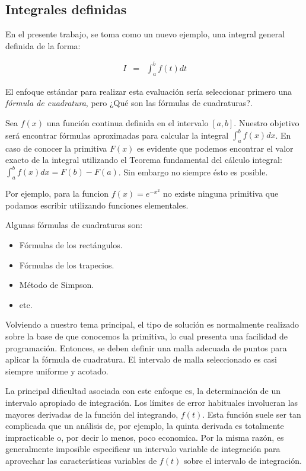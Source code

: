 \subsection{Integrales definidas}
En el presente trabajo, se toma como un nuevo ejemplo, una integral general definida de la forma:

\begin{eqnarray}
	I &=& \int_{a}^{b} f(t) dt
\end{eqnarray}

El enfoque estándar para realizar esta evaluación sería seleccionar primero una \emph{fórmula de cuadratura},
pero ¿Qué son las fórmulas de cuadraturas?.

Sea $f(x)$ una función continua definida en el intervalo $[a, b]$.
Nuestro objetivo será encontrar fórmulas aproximadas para calcular la integral $\int_{a}^{b}f(x) dx$.
En caso de conocer la primitiva $F(x)$ es evidente que podemos encontrar el valor exacto de la integral
utilizando el Teorema fundamental del cálculo integral: $\int_{a}^{b}f(x) dx = F(b) - F(a)$.
Sin embargo no siempre ésto es posible.

Por ejemplo, para la funcion $f(x) = e^{-x^{2}}$
no existe ninguna primitiva que podamos escribir utilizando funciones elementales.

Algunas fórmulas de cuadraturas son:
\begin{itemize}
	\item Fórmulas de los rectángulos.
	\item Fórmulas de  los trapecios.
	\item Método de Simpson.
	\item etc.
\end{itemize}

Volviendo a nuestro tema principal, el tipo de solución es normalmente realizado sobre la base de que conocemos
la primitiva, lo cual presenta una  facilidad de programación.
Entonces, se deben definir una malla adecuada de puntos para aplicar la fórmula de cuadratura.
El intervalo de malla seleccionado es casi siempre uniforme y acotado.

La principal dificultad asociada con este enfoque es, la determinación de un intervalo apropiado de integración.
Los límites de error habituales involucran las mayores derivadas de la función del integrando, $f(t)$.
Esta función suele ser tan complicada que un análisis de, por ejemplo, la quinta derivada es totalmente impracticable o,
por decir lo menos, poco economica.
Por la misma razón, es generalmente imposible especificar un intervalo variable de integración para aprovechar las
características variables de $f(t)$ sobre el intervalo de integración.

